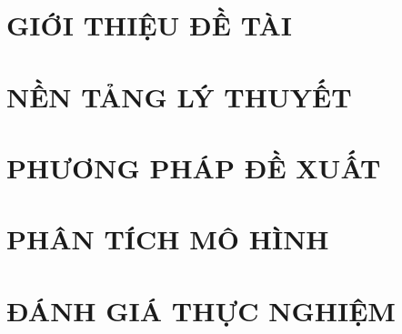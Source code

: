 \documentclass[a4paper,13pt,3p,oneside]{report}
\theoremstyle{definition}
\begin{document}
\renewcommand{\listtablename}{DANH MỤC BẢNG BIỂU}
{\let\oldnumberline\numberline
\renewcommand{\numberline}{Bảng~\oldnumberline}
\listoftables}

\glsaddall 
\renewcommand*{\acronymname}{DANH MỤC THUẬT NGỮ VÀ TỪ VIẾT TẮT}
\renewcommand*{\entryname}{Thuật ngữ}
\renewcommand*{\descriptionname}{Ý nghĩa}
\printnoidxglossaries

\renewcommand\appendixname{PHỤ LỤC}
\renewcommand\appendixpagename{PHỤ LỤC}
\renewcommand\appendixtocname{PHỤ LỤC}





\newpage
{}

\pagestyle{fancy}
\fancyhf{}
\fancyhead[L]{\leftmark}
\fancyfoot[R]{\thepage}

\chapter{GIỚI THIỆU ĐỀ TÀI}

\newpage
\chapter{NỀN TẢNG LÝ THUYẾT}



\newpage
\chapter{PHƯƠNG PHÁP ĐỀ XUẤT}


\newpage
\chapter{PHÂN TÍCH MÔ HÌNH}


\newpage
\chapter{ĐÁNH GIÁ THỰC NGHIỆM}

\end{document}

